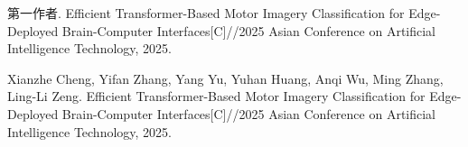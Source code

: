 \begin{resume}

\begin{enumerate}[label={[\arabic*]},labelsep=6pt,topsep=0pt,partopsep=0pt,
parsep=0pt,itemsep=1pt,leftmargin=0em,itemindent=42pt]
\ifisanon
\item 第一作者. Efficient Transformer-Based Motor Imagery Classification for Edge-Deployed Brain-Computer Interfaces[C]//2025 Asian Conference on Artificial Intelligence Technology, 2025.
\else
\item Xianzhe Cheng, Yifan Zhang, Yang Yu, Yuhan Huang, Anqi Wu, Ming Zhang, Ling-Li Zeng. Efficient Transformer-Based Motor Imagery Classification for Edge-Deployed Brain-Computer Interfaces[C]//2025 Asian Conference on Artificial Intelligence Technology, 2025.
\fi
\end{enumerate}

\end{resume}

